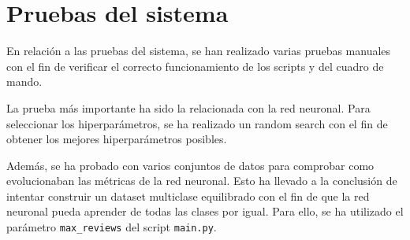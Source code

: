 \section{Pruebas del sistema}

En relación a las pruebas del sistema, se han realizado varias pruebas manuales con el fin de 
verificar el correcto funcionamiento de los scripts y del cuadro de mando.

La prueba más importante ha sido la relacionada con la red neuronal.
Para seleccionar los hiperparámetros, se ha realizado un random search con el fin de obtener los mejores hiperparámetros posibles.

Además, se ha probado con varios conjuntos de datos para comprobar como evolucionaban las métricas de la red neuronal.
Esto ha llevado a la conclusión de intentar construir un dataset multiclase equilibrado con el fin de que la red neuronal pueda aprender de todas las clases por igual.
Para ello, se ha utilizado el parámetro \texttt{max\_reviews} del script \texttt{main.py}.